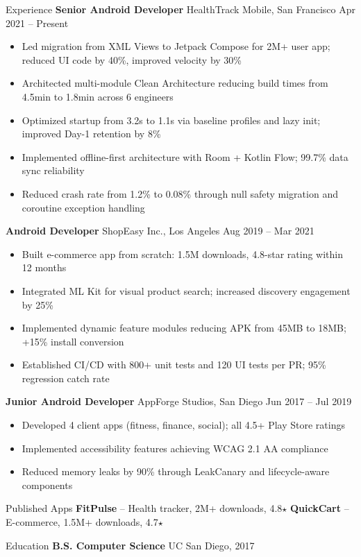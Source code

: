 \documentclass[9.5pt,a4paper]{article}
\begin{document}
\begin{card}{Experience}
\textbf{Senior Android Developer} \quad\textbar\quad HealthTrack Mobile, San Francisco \hfill Apr 2021 -- Present
\begin{itemize}
  \item Led migration from XML Views to Jetpack Compose for 2M+ user app; reduced UI code by 40\%, improved velocity by 30\%
  \item Architected multi-module Clean Architecture reducing build times from 4.5min to 1.8min across 6 engineers
  \item Optimized startup from 3.2s to 1.1s via baseline profiles and lazy init; improved Day-1 retention by 8\%
  \item Implemented offline-first architecture with Room + Kotlin Flow; 99.7\% data sync reliability
  \item Reduced crash rate from 1.2\% to 0.08\% through null safety migration and coroutine exception handling
\end{itemize}

\vspace{4pt}
\textbf{Android Developer} \quad\textbar\quad ShopEasy Inc., Los Angeles \hfill Aug 2019 -- Mar 2021
\begin{itemize}
  \item Built e-commerce app from scratch: 1.5M downloads, 4.8-star rating within 12 months
  \item Integrated ML Kit for visual product search; increased discovery engagement by 25\%
  \item Implemented dynamic feature modules reducing APK from 45MB to 18MB; +15\% install conversion
  \item Established CI/CD with 800+ unit tests and 120 UI tests per PR; 95\% regression catch rate
\end{itemize}

\vspace{4pt}
\textbf{Junior Android Developer} \quad\textbar\quad AppForge Studios, San Diego \hfill Jun 2017 -- Jul 2019
\begin{itemize}
  \item Developed 4 client apps (fitness, finance, social); all 4.5+ Play Store ratings
  \item Implemented accessibility features achieving WCAG 2.1 AA compliance
  \item Reduced memory leaks by 90\% through LeakCanary and lifecycle-aware components
\end{itemize}
\end{card}

\vspace{3pt}

\begin{card}{Published Apps}
\textbf{FitPulse} -- Health tracker, 2M+ downloads, 4.8$\star$ \quad\textbar\quad \textbf{QuickCart} -- E-commerce, 1.5M+ downloads, 4.7$\star$
\end{card}

\vspace{3pt}

\begin{card}{Education}
\textbf{B.S. Computer Science} \hfill UC San Diego, 2017
\end{card}
\end{document}
